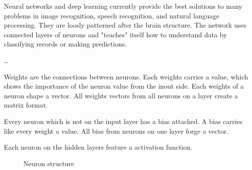 Neural networks and deep learning currently provide the best solutions to many problems in image recognition, speech recognition, and natural language processing.
\cite{nielsen-book}
They are loosly patterned after the brain structure.
The network uses connected layers of neurons and "teaches" itself how to understand data by classifying records or making predictions.
\cite{ibm-watson-healthcare}

…

Weights are the connections between neurons.
Each weights carries a value, which shows the importance of the neuron value from the inout side.
Each weights of a neuron shape a vector.
All weights vectors from all neurons on a layer create a matrix format.

Every neuron which is not on the input layer has a bias attached.
A bias carries like every weight a value.
All bias from neurons on one layer forge a vector.

Each neuron on the hidden layers feature a activation function.

\begin{figure}[H]
    \centering
    \caption{\cite{dnn_neuron_basic_overview} Neuron structure}
    \label{fig:dnn_node_procedure}
\end{figure}

